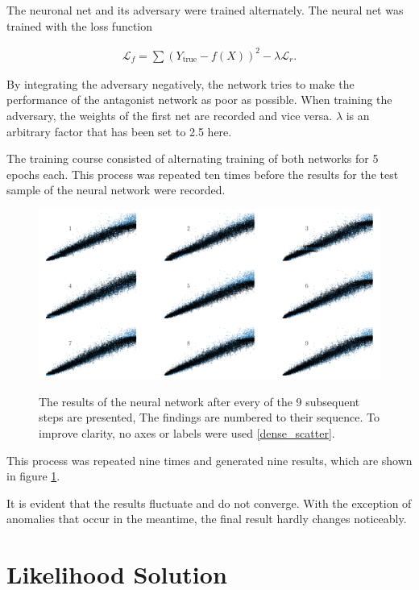 \documentclass[12pt, a4paper]{thesis}
\begin{document}
The neuronal net and its adversary were trained alternately. The
neural net was trained with the loss function

\begin{align}
\mathcal{L}_f = \sum (Y_{\text{true}} - f(X))^2 - \lambda \mathcal{L}_r.
\end{align}

By integrating the adversary negatively, the network tries to make the
performance of the antagonist network as poor as possible. When
training the adversary, the weights of the first net are recorded and
vice versa. \(\lambda\) is an arbitrary factor that has been set to 2.5
here.

The training course consisted of alternating training of both networks
for 5 epochs each. This process was repeated ten times before the
results for the test sample of the neural network were recorded.

\begin{figure}[htbp]
\centering
\includegraphics[width=.9\linewidth]{../images/adv_scatter.png}
\label{adv_scatter}
\caption{ The results of the neural network
  after every of the 9 subsequent steps are presented, The findings
  are numbered to their sequence. To improve clarity, no axes or
  labels were used \ref{dense_scatter}.}
\end{figure}

This process was repeated nine times and generated nine results, which
are shown in figure \ref{adv_scatter}.

It is evident that the results fluctuate and do not converge. With
the exception of anomalies that occur in the meantime, the final
result hardly changes noticeably.

\section{Likelihood Solution}
\label{sec:org05c2ceb}
\end{document}
